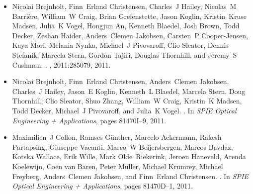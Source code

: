 \begin{itemize}
\item
Nicolai Brejnholt, Finn~Erland Christensen, Charles~J Hailey, Nicolas~M
  Barri{\`e}re, William~W Craig, Brian Grefenstette, Jason Koglin,
  Kristin~Kruse Madsen, Julia~K Vogel, Hongjun An, Kenneth Blaedel, Josh Brown,
  Todd Decker, Zeshan Haider, Anders~Clemen Jakobsen, Carsten~P Cooper-Jensen,
  Kaya Mori, Melania Nynka, Michael~J Pivovaroff, Clio Sleator, Dennis
  Stefanik, Marcela Stern, Gordon Tajiri, Douglas Thornhill, and Jeremy~S
  Cushman.
.
, 2011:285079, 2011.

\item
Nicolai Brejnholt, Finn~Erland Christensen, Anders~Clemen Jakobsen, Charles~J
  Hailey, Jason~E Koglin, Kenneth~L Blaedel, Marcela Stern, Doug Thornhill,
  Clio Sleator, Shuo Zhang, William~W Craig, Kristin~K Madsen, Todd Decker,
  Michael~J Pivovaroff, and Julia~K Vogel.
.
\newblock In {\em SPIE Optical Engineering + Applications}, pages 81470I--9,
  2011.

\item
Maximilien~J Collon, Ramses G{\"u}nther, Marcelo Ackermann, Rakesh Partapsing,
  Giuseppe Vacanti, Marco~W Beijersbergen, Marcos Bavdaz, Kotska Wallace, Erik
  Wille, Mark Olde~Riekerink, Jeroen Haneveld, Arenda Koelewijn, Coen van
  Baren, Peter M{\"u}ller, Michael Krumrey, Michael Freyberg, Anders~Clemen
  Jakobsen, and Finn~Erland Christensen.
.
\newblock In {\em SPIE Optical Engineering + Applications}, pages 81470D--1,
  2011.

\end{itemize}
